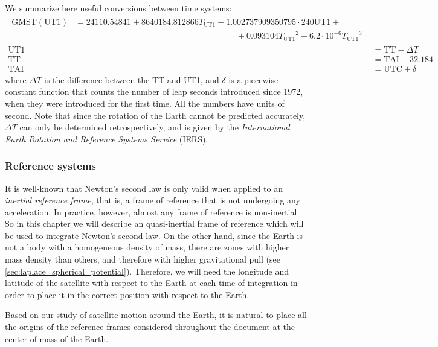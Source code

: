 \documentclass[../main.tex]{subfiles}
\begin{document}
We summarize here useful conversions between time systems:
\begin{align*}
  \begin{split}
    \mathrm{GMST}(\mathrm{UT1})&=24110.54841+8640184.812866{T_{\text{UT1}}}+1.002737909350795\cdot240\text{UT1}+\\
    &\hspace{8cm}+0.093104{T_{\text{UT1}}}^2-{6.2\cdot 10^{-6}}{T_{\text{UT1}}}^3
  \end{split} \\
  \text{UT1} & =\text{TT}-\Delta T                                                                                         \\
  \text{TT}  & =\text{TAI}-32.184                                                                                          \\
  \text{TAI} & =\text{UTC}+\delta
\end{align*}
where $\Delta T$ is the difference between the TT and UT1, and $\delta$ is a piecewise constant function that counts the number of leap seconds introduced since 1972, when they were introduced for the first time. All the numbers have units of second. Note that since the rotation of the Earth cannot be predicted accurately, $\Delta T$ can only be determined retrospectively, and is given by the \emph{International Earth Rotation and Reference Systems Service} (IERS).
\subsubsection{Reference systems}\label{sec:reference_systems}
It is well-known that Newton's second law is only valid when applied to an \emph{inertial reference frame}, that is, a frame of reference that is not undergoing any acceleration. In practice, however, almost any frame of reference is non-inertial. So in this chapter we will describe an quasi-inertial frame of reference which will be used to integrate Newton's second law. On the other hand, since the Earth is not a body with a homogeneous density of mass, there are zones with higher mass density than others, and therefore with higher gravitational pull (see \cref{sec:laplace_spherical_potential}). Therefore, we will need the longitude and latitude of the satellite with respect to the Earth at each time of integration in order to place it in the correct position with respect to the Earth.

Based on our study of satellite motion around the Earth, it is natural to place all the origins of the reference frames considered throughout the document at the center of mass of the Earth.
\end{document}
